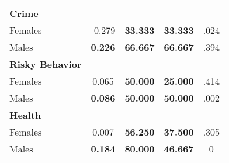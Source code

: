 \begin{tabular}{l c c c c}
\midrule
\textbf{Crime} & & & & \\
\quad Females &     -0.279 & \textbf{   33.333} & \textbf{   33.333} & .024 \\
\quad Males &  \textbf{    0.226} & \textbf{   66.667} & \textbf{   66.667} & .394 \\
\midrule
\textbf{Risky Behavior} & & & & \\
\quad Females &      0.065 & \textbf{   50.000} & \textbf{   25.000} & .414 \\
\quad Males &  \textbf{    0.086} & \textbf{   50.000} & \textbf{   50.000} & .002 \\
\midrule
\textbf{Health} & & & & \\
\quad Females &      0.007 & \textbf{   56.250} & \textbf{   37.500} & .305 \\
\quad Males &  \textbf{    0.184} & \textbf{   80.000} & \textbf{   46.667} & 0 \\
\bottomrule
\end{tabular}
